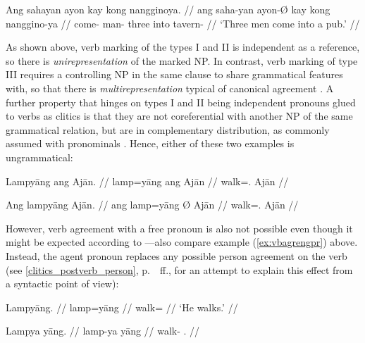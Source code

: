 \ex\label{ex:verbplagr} %
\begingl
	\gla Ang sahayan ayon kay kong nangginoya. //
	\glb ang saha-yan ayon-Ø kay kong nanggino-ya //
	\glc \AgtT{} come-\TplM{} man-\Top{} three into tavern-\Loc{} //
	\glft `Three men come into a pub.' //
\endgl\xe

As shown above, verb marking of the types I and II is independent as a
reference, so there is \emph{unirepresentation} of the marked NP. In contrast,
verb marking of type III requires a controlling NP in the same clause to share
grammatical features with, so that there is \emph{multirepresentation} typical
of canonical agreement \citep[106]{corbett2006}.
A further property that hinges on types I and II
being independent pronouns glued to verbs as clitics is that they are not
coreferential with another NP of the same grammatical relation, but are in
complementary distribution, as commonly assumed with pronominals
\citep[108]{corbett2006}. Hence, either of these two examples is ungrammatical:

\pex %
\a\ljudge* \begingl
	\gla Lampyāng ang Ajān. //
	\glb lamp=yāng ang ​Ajān //
	\glc walk=\TsgM{}.\Aarg{} \Aarg{} Ajān //
\endgl

\a\ljudge* \begingl	
	\gla Ang lampyāng {} Ajān. //
	\glb ang lamp=yāng Ø ​Ajān //
	\glc \AgtT{} walk=\TsgM{}.\Aarg{} \Top{} ​Ajān //
\endgl

\xe

However, verb agreement with a free pronoun is also not possible even though
it might be expected according to \citep[109]{corbett2006}---also compare
example (\ref{ex:vbagrengpr}) above. Instead, the agent pronoun replaces any
possible person agreement on the verb (see \autoref{clitics_postverb_person},
p.~\pageref{clitics_postverb_person}~ff., for an attempt to explain this effect
from a syntactic point of view):

\pex %
\a\begingl
	\gla Lampyāng. //
	\glb lamp=yāng //
	\glc walk=\TsgM{} //
	\glft `He walks.' //
\endgl

\a\ljudge* \begingl	
	\gla Lampya yāng. //
	\glb lamp-ya yāng //
	\glc walk-\TsgM{} \TsgM{}.\Aarg{} //
\endgl

\xe

